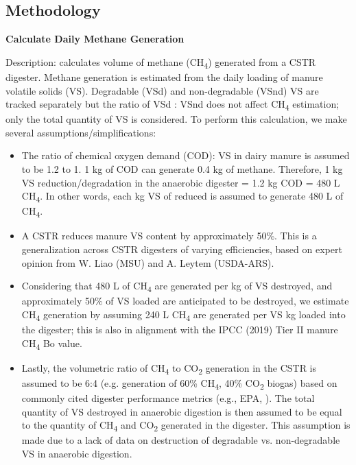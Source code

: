 \begin{refsection}
\begin{itemize}
\end{itemize}
\vspace{0.2cm}




\subsection{Methodology}
    \vspace{0.2cm}

    \textbf{Calculate Daily Methane Generation}
    \vspace{ 0.3cm}

    Description: calculates volume of methane (CH\textsubscript{4}) generated from a CSTR digester. Methane generation is estimated from the daily loading of manure volatile solids (VS). Degradable (VSd) and non-degradable (VSnd) VS are tracked separately but the ratio of VSd : VSnd does not affect CH\textsubscript{4} estimation; only the total quantity of VS is considered. To perform this calculation, we make several assumptions/simplifications: 
    \begin{itemize}
        \item The ratio of chemical oxygen demand (COD): VS in dairy manure is assumed to be 1.2 to 1. 1 kg of COD can generate 0.4 kg of methane. Therefore, 1 kg VS reduction/degradation in the anaerobic digester = 1.2 kg COD = 480 L CH\textsubscript{4}. In other words, each kg VS of reduced is assumed to generate 480 L of CH\textsubscript{4}. 
        \item A CSTR reduces manure VS content by approximately 50\%. This is a generalization across CSTR digesters of varying efficiencies, based on expert opinion from W. Liao (MSU) and A. Leytem (USDA-ARS). 
        \item Considering that 480 L of CH\textsubscript{4} are generated per kg of VS destroyed, and approximately 50\% of VS loaded are anticipated to be destroyed, we estimate CH\textsubscript{4} generation by assuming 240 L CH\textsubscript{4} are generated per VS kg loaded into the digester; this is also in alignment with the IPCC (2019) Tier II manure CH\textsubscript{4} Bo value.
        \item Lastly, the volumetric ratio of CH\textsubscript{4} to CO\textsubscript{2} generation in the CSTR is assumed to be 6:4 (e.g. generation of 60\% CH\textsubscript{4}, 40\% CO\textsubscript{2} biogas) based on commonly cited digester performance metrics (e.g., EPA, \cite{Fernandez2015}). The total quantity of VS destroyed in anaerobic digestion is then assumed to be equal to the quantity of CH\textsubscript{4} and CO\textsubscript{2} generated in the digester. This assumption is made due to a lack of data on destruction of degradable vs. non-degradable VS in anaerobic digestion.
    \end{itemize}
         \vspace{0.2cm}


\end{refsection}
